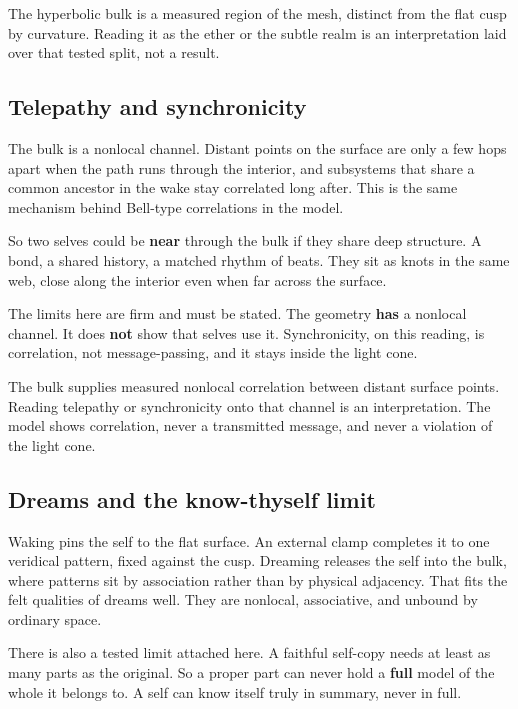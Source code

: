 \begin{result}
The hyperbolic bulk is a measured region of the mesh, distinct from the flat cusp by curvature. Reading it as the ether or the subtle realm is an interpretation laid over that tested split, not a result.
\end{result}

\subsection{Telepathy and synchronicity}

The bulk is a nonlocal channel. Distant points on the surface are only a few hops apart when the path runs through the interior, and subsystems that share a common ancestor in the wake stay correlated long after. This is the same mechanism behind Bell-type correlations in the model.

So two selves could be \textbf{near} through the bulk if they share deep structure. A bond, a shared history, a matched rhythm of beats. They sit as knots in the same web, close along the interior even when far across the surface.

The limits here are firm and must be stated. The geometry \textbf{has} a nonlocal channel. It does \textbf{not} show that selves use it. Synchronicity, on this reading, is correlation, not message-passing, and it stays inside the light cone.

\begin{result}
The bulk supplies measured nonlocal correlation between distant surface points. Reading telepathy or synchronicity onto that channel is an interpretation. The model shows correlation, never a transmitted message, and never a violation of the light cone.
\end{result}

\subsection{Dreams and the know-thyself limit}

Waking pins the self to the flat surface. An external clamp completes it to one veridical pattern, fixed against the cusp. Dreaming releases the self into the bulk, where patterns sit by association rather than by physical adjacency. That fits the felt qualities of dreams well. They are nonlocal, associative, and unbound by ordinary space.

There is also a tested limit attached here. A faithful self-copy needs at least as many parts as the original. So a proper part can never hold a \textbf{full} model of the whole it belongs to. A self can know itself truly in summary, never in full.

